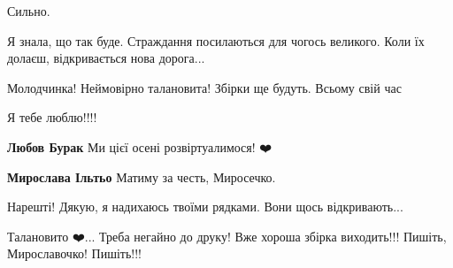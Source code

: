 \begin{itemize}
Сильно.

 

Я знала, що так буде. Страждання посилаються для чогось великого. Коли їх долаєш, відкривається нова дорога...

Молодчинка! Неймовірно талановита! Збірки ще будуть. Всьому свій час

 

Я тебе люблю!!!!

\begin{itemize}
 
\textbf{Любов Бурак} Ми цієї осені розвіртуалимося! ❤️

 

\textbf{Мирослава Ільтьо} Матиму за честь, Миросечко.
\end{itemize}

 
Нарешті!
Дякую, я надихаюсь твоїми рядками. Вони щось відкривають...

 
Талановито ❤️... Треба негайно до друку! Вже хороша збірка виходить!!! Пишіть, Мирославочко! Пишіть!!!


\end{itemize}
